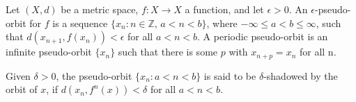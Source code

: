 \documentclass[12pt]{article}
\newcommand{\Z}{\mathbb{Z}}
\begin{document}
Let $(X,d)$ be a metric space, $f\colon X\to X$ a function, and let $\epsilon>0$. An $\epsilon$-pseudo-orbit for $f$ is a sequence $\{x_n:n\in\Z,\, a<n<b\}$, where $-\infty\leq a<b \leq \infty$, such that $d(x_{n+1},f(x_n))<\epsilon$ for all $a<n<b$. A periodic pseudo-orbit is an infinite pseudo-orbit $\{x_n\}$ such that there is some $p$ with $x_{n+p}=x_n$ for all n.

Given $\delta>0$, the pseudo-orbit $\{x_n: a<n<b\}$ is said to be $\delta$-shadowed by the orbit of $x$, if $d(x_n,f^n(x))<\delta$ for all $a<n<b$.
\end{document}
